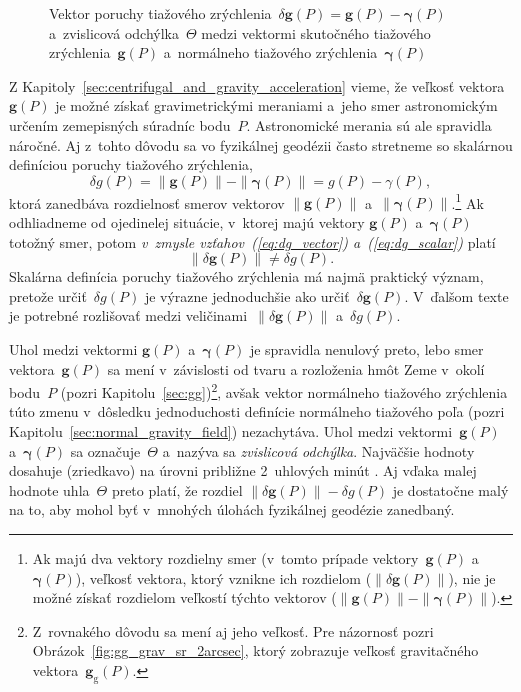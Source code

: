 \documentclass[a4paper,12pt]{book}
\newcommand{\gidx}{\mathrm g}
\let\vec\mathbf
\begin{document}
\begin{figure}[bt]
\centering

\caption{Vektor poruchy tiažového zrýchlenia~$\delta \vec g(P) = \vec g(P) 
- \boldsymbol\gamma(P)$ a~zvislicová odchýlka~$\Theta$ medzi vektormi 
skutočného tiažového zrýchlenia~$\vec g(P)$ a~normálneho tiažového 
zrýchlenia~$\boldsymbol\gamma(P)$}
\label{fig:gravity_disturbance}
\end{figure}

Z Kapitoly~\ref{sec:centrifugal_and_gravity_acceleration} vieme, že veľkosť 
vektora~$\vec g(P)$ je možné získať gravimetrickými meraniami a~jeho smer 
astronomickým určením zemepisných súradníc bodu~$P$.  Astronomické merania sú 
ale spravidla náročné.  Aj z~tohto dôvodu sa vo fyzikálnej geodézii často 
stretneme so skalárnou definíciou poruchy tiažového zrýchlenia,
%
\begin{equation}
\label{eq:dg_scalar}
\delta g(P) = \| \vec g(P) \| - \| \boldsymbol \gamma(P) \| = g(P) 
- \gamma(P){,}
\end{equation}
%
ktorá zanedbáva rozdielnosť smerov vektorov $\| \vec g(P) \|$ a~$\| \boldsymbol 
\gamma(P) \|$.\footnote{Ak majú dva vektory rozdielny smer (v~tomto prípade 
vektory~$\vec g(P)$ a~$\boldsymbol \gamma(P)$), veľkosť vektora, ktorý vznikne 
ich rozdielom ($\| \delta \vec g(P) \|$), nie je možné získať rozdielom 
veľkostí týchto vektorov ($\| \vec g(P) \| - \| \boldsymbol \gamma(P) \|$).}  
Ak odhliadneme od ojedinelej situácie, v~ktorej majú vektory $\vec g(P)$ 
a~$\boldsymbol{\gamma}(P)$ totožný smer, potom \emph{v~zmysle 
vzťahov~(\ref{eq:dg_vector}) a~(\ref{eq:dg_scalar})} platí
%
\begin{equation}
\| \delta \vec g(P) \| \neq \delta g(P){.}
\end{equation}
%
Skalárna definícia poruchy tiažového zrýchlenia má najmä praktický význam, 
pretože určiť~$\delta g(P)$ je výrazne jednoduchšie ako určiť~$\delta \vec 
g(P)$.  V~ďalšom texte je potrebné rozlišovať medzi veličinami~$\| \delta \vec 
g(P) \|$ a~$\delta g(P)$.

Uhol medzi vektormi $\vec g(P)$ a~$\boldsymbol{\gamma}(P)$ je spravidla 
nenulový preto, lebo smer vektora~$\vec g(P)$ sa mení v~závislosti od tvaru 
a rozloženia hmôt Zeme v~okolí bodu~$P$ (pozri 
Kapitolu~\ref{sec:gg})\footnote{Z~rovnakého dôvodu sa mení aj jeho veľkosť.  
Pre názornosť pozri Obrázok~\ref{fig:gg_grav_sr_2arcsec}, ktorý zobrazuje 
veľkosť gravitačného vektora~$\vec g_\gidx(P)$.}, avšak vektor normálneho 
tiažového zrýchlenia túto zmenu v~dôsledku jednoduchosti definície normálneho 
tiažového poľa (pozri Kapitolu~\ref{sec:normal_gravity_field}) nezachytáva.  
Uhol medzi vektormi~$\vec g(P)$ a~$\boldsymbol \gamma(P)$ sa označuje~$\Theta$ 
a~nazýva sa \emph{zvislicová odchýlka}.  Najväčšie hodnoty dosahuje (zriedkavo) 
na úrovni približne 2~uhlových minút \parencite{GGMplus}.  Aj vďaka malej 
hodnote uhla~$\Theta$ preto platí, že rozdiel $\| \delta \vec g(P) \| - \delta 
g(P)$ je dostatočne malý na to, aby mohol byť v~mnohých úlohách fyzikálnej 
geodézie zanedbaný.
\end{document}
